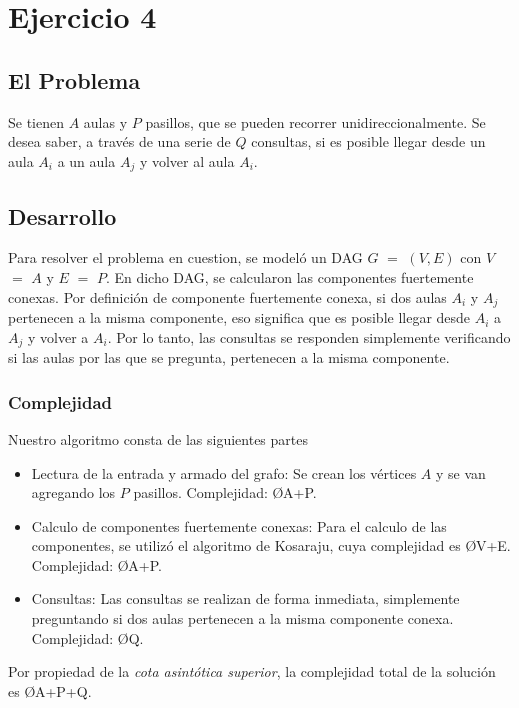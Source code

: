 \section{Ejercicio 4}
\subsection{El Problema}
Se tienen $A$ aulas y $P$ pasillos, que se pueden recorrer unidireccionalmente. Se desea saber, a través de una serie de $Q$ consultas, si es posible llegar desde un aula $A_{i}$ a un aula $A_{j}$ y volver al aula $A_{i}$.

\subsection{Desarrollo}
Para resolver el problema en cuestion, se modeló un DAG $G$ $=$ $(V,E)$ con $V$ $=$ $A$ y $E$ $=$ $P$.
En dicho DAG, se calcularon las componentes fuertemente conexas.
Por definición de componente fuertemente conexa, si dos aulas $A_{i}$ y $A_{j}$ pertenecen a la misma componente, eso significa que es posible llegar desde $A_{i}$ a $A_{j}$ y volver a $A_{i}$\textsuperscript{\cite{cfc}}.
Por lo tanto, las consultas se responden simplemente verificando si las aulas por las que se pregunta, pertenecen a la misma componente.

\subsubsection{Complejidad}
Nuestro algoritmo consta de las siguientes partes
\begin{itemize}
	\item Lectura de la entrada y armado del grafo: Se crean los vértices $A$ y se van agregando los $P$ pasillos. Complejidad: \O{A+P}.
	\item Calculo de componentes fuertemente conexas: Para el calculo de las componentes, se utilizó el algoritmo de Kosaraju, cuya complejidad es \O{V+E}\textsuperscript{\cite{cormen}}. Complejidad: \O{A+P}.
	\item Consultas: Las consultas se realizan de forma inmediata, simplemente preguntando si dos aulas pertenecen a la misma componente conexa. Complejidad: \O{Q}.
\end{itemize}

Por propiedad de la \emph{cota asintótica superior}, la complejidad total de la solución es \O{A+P+Q}.